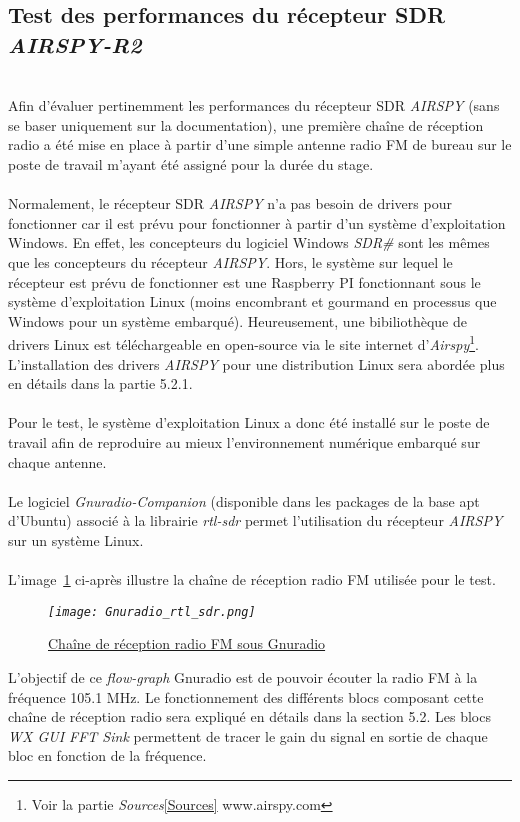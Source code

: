 \documentclass[12pt,fleqn]{book} %
\begin{document}
\subsection{Test des performances du récepteur SDR \emph{AIRSPY-R2}}
~\\\indent Afin d'évaluer pertinemment les performances du récepteur SDR \emph{AIRSPY} (sans se baser uniquement sur la documentation), une première chaîne de réception radio a été mise en place à partir d'une simple antenne radio FM de bureau sur le poste de travail m'ayant été assigné pour la durée du stage.
~\\\\Normalement, le récepteur SDR \emph{AIRSPY} n'a pas besoin de drivers pour fonctionner car il est prévu pour fonctionner à partir d'un système d'exploitation Windows. En effet, les concepteurs du logiciel Windows \emph{SDR\#} sont les mêmes que les concepteurs du récepteur \emph{AIRSPY}. Hors, le système sur lequel le récepteur est prévu de fonctionner est une Raspberry PI fonctionnant sous le système d'exploitation Linux (moins encombrant et gourmand en processus que Windows pour un système embarqué). Heureusement, une bibiliothèque de drivers Linux est téléchargeable en open-source via le site internet d'\emph{Airspy}\footnote{Voir la partie \emph{Sources}\ref{Sources} www.airspy.com}. L'installation des drivers \emph{AIRSPY} pour une distribution Linux sera abordée plus en détails dans la partie 5.2.1.
~\\\\Pour le test, le système d'exploitation Linux a donc été installé sur le poste de travail afin de reproduire au mieux l'environnement numérique embarqué sur chaque antenne.
~\\\\Le logiciel \emph{Gnuradio-Companion} (disponible dans les packages de la base apt d'Ubuntu) associé à la librairie \emph{rtl-sdr} permet l'utilisation du récepteur \emph{AIRSPY} sur un système Linux. 
~\\\\L'image~\underline{\color{blue}\ref{gnu_airspy}} ci-après illustre la chaîne de réception radio FM utilisée pour le test.
\begin{figure}[H]
	\centering
	\itshape
	\texttt{[image: Gnuradio\_rtl\_sdr.png]}
	\caption{\label{gnu_airspy} \underline{Chaîne de réception radio FM sous Gnuradio}}
\end{figure}
L'objectif de ce \emph{flow-graph} Gnuradio est de pouvoir écouter la radio FM à la fréquence 105.1 MHz. Le fonctionnement des différents blocs composant cette chaîne de réception radio sera expliqué en détails dans la section 5.2. Les blocs \emph{WX GUI FFT Sink} permettent de tracer le gain du signal en sortie de chaque bloc en fonction de la fréquence.
\end{document}
